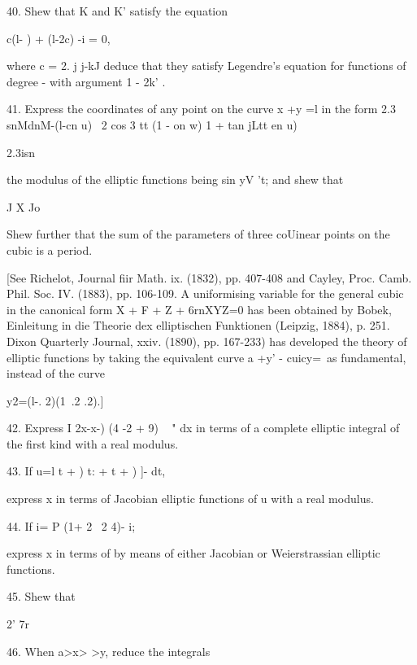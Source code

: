 
40. Shew that K and K' satisfy the equation

c(l- ) + (l-2c) -i = 0,

where c = 2. j j-kJ deduce that they satisfy Legendre's equation for
functions of degree - with argument 1 - 2k' .

%
%

41. Express the coordinates of any point on the curve x +y =l in the
form 2.3 snMdnM-(l-cn u) \ 2 cos 3 tt (1 - on w) 1 + tan jLtt en u)

2.3isn%

the modulus of the elliptic functions being sin yV 't; and shew that

J X Jo

Shew further that the sum of the parameters of three coUinear points
on the cubic is a period.

[See Richelot, Journal fiir Math. ix. (1832), pp. 407-408 and Cayley,
Proc. Camb. Phil. Soc. IV. (1883), pp. 106-109. A uniformising
variable for the general cubic in the canonical form X + F + Z +
6rnXYZ=0 has been obtained by Bobek, Einleitung in die Theorie dex
elliptischen Funktionen (Leipzig, 1884), p. 251. Dixon Quarterly
Journal, xxiv. (1890), pp. 167-233) has developed the theory of
elliptic functions by taking the equivalent curve a +y' - cuicy=\ as
fundamental, instead of the curve

y2=(l-. 2)(1\ .2 .2).]

42. Express I 2x-x-) (4 -2 + 9) ~ " dx in terms of a complete elliptic
integral of the first kind with a real modulus. 

43. If u=l t + ) t: + t + ) ]- dt,

express x in terms of Jacobian elliptic functions of u with a real
modulus.


44. If i= P (1+ 2 \ 2 4)- i;

express x in terms of by means of either Jacobian or Weierstrassian
elliptic functions.


45. Shew that

2' 7r


46. When a>x> >y, reduce the integrals

